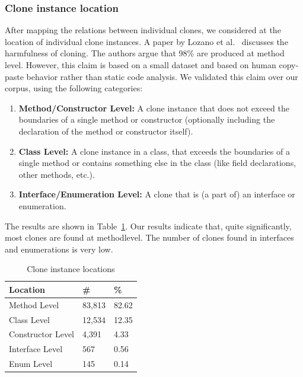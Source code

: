 \documentclass[a4paper]{article}
\begin{document}
\subsubsection{Clone instance location}\label{chap:clonelocation}
After mapping the relations between individual clones, we considered at the location of individual clone instances. A paper by Lozano et al.~\cite{lozano2007evaluating} discusses the harmfulness of cloning. The authors argue that 98\% are produced at method level. However, this claim is based on a small dataset and based on human copy-paste behavior rather than static code analysis. We validated this claim over our corpus, using the following categories:
\begin{enumerate}
  \item \textbf{Method/Constructor Level:} A clone instance that does not exceed the boundaries of a single method or constructor (optionally including the declaration of the method or constructor itself).
  \item \textbf{Class Level:} A clone instance in a class, that exceeds the boundaries of a single method or contains something else in the class (like field declarations, other methods, etc.).
  \item \textbf{Interface/Enumeration Level:} A clone that is (a part of) an interface or enumeration.
\end{enumerate}

The results are shown in Table~\ref{table:locations}. Our results indicate that, quite significantly, most clones are found at methodlevel. The number of clones found in interfaces and enumerations is very low.

\begin{table}[H]
  \begin{center}
  \caption{Clone instance locations} \label{table:locations}
  \medskip
\begin{tabular}{|l|l|l|}
\hline
\textbf{Location}   & \textbf{\#} & \textbf{\%} \\ \hline
Method Level        & 83,813 & 82.62            \\ \hline
Class Level        & 12,534 & 12.35            \\ \hline
Constructor Level    & 4,391 & 4.33           \\ \hline
Interface Level   & 567 & 0.56           \\ \hline
Enum Level         & 145 & 0.14            \\ \hline
\end{tabular}
\end{center}
\end{table}
\end{document}
